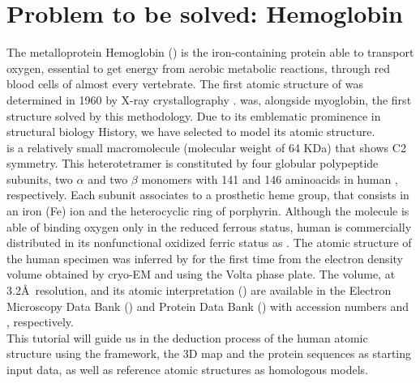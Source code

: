 
\section{Problem to be solved: Hemoglobin}

The metalloprotein Hemoglobin () is the iron-containing protein able to transport oxygen, essential to get energy from aerobic metabolic reactions, through red blood cells of almost every vertebrate. The first atomic structure of  was determined in 1960 by X-ray crystallography \citep{perutz1960}.  was, alongside myoglobin, the first structure solved by this methodology. Due to its emblematic prominence in structural biology History, we have selected  to model its atomic structure.\\

 is a relatively small macromolecule (molecular weight of 64 KDa) that shows C2 symmetry. This heterotetramer is constituted by four globular polypeptide subunits, two $\alpha$ and two $\beta$ monomers with 141 and 146 aminoacids in human , respectively. Each subunit associates to a prosthetic heme group, that consists in an iron (Fe) ion and the heterocyclic ring of porphyrin. Although the molecule is able of binding oxygen only in the reduced ferrous status, human  is commercially distributed in its nonfunctional oxidized ferric status as . The atomic structure of the human  specimen was inferred by \citet{khoshouei2017} for the first time from the electron density volume obtained by cryo-EM and using the Volta phase plate. The volume, at 3.2\AA\ resolution, and its atomic interpretation () are available in the Electron Microscopy Data Bank () and Protein Data Bank () with accession numbers  and , respectively.\\

This tutorial will guide us in the deduction process of the human  atomic structure using the \scipion framework, the 3D map and the protein sequences as starting input data, as well as reference atomic structures as homologous models. %

